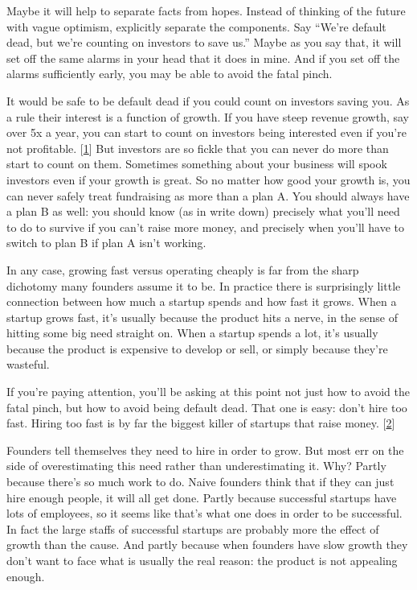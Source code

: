 Maybe it will help to separate facts from hopes. Instead of thinking of
the future with vague optimism, explicitly separate the components. Say
``We're default dead, but we're counting on investors to save us.''
Maybe as you say that, it will set off the same alarms in your head that
it does in mine. And if you set off the alarms sufficiently early, you
may be able to avoid the fatal pinch.

It would be safe to be default dead if you could count on investors
saving you. As a rule their interest is a function of growth. If you
have steep revenue growth, say over 5x a year, you can start to count on
investors being interested even if you're not profitable.
{[}\hyperref[f1n]{1}{]} But investors are so fickle that you can never
do more than start to count on them. Sometimes something about your
business will spook investors even if your growth is great. So no matter
how good your growth is, you can never safely treat fundraising as more
than a plan A. You should always have a plan B as well: you should know
(as in write down) precisely what you'll need to do to survive if you
can't raise more money, and precisely when you'll have to switch to plan
B if plan A isn't working.

In any case, growing fast versus operating cheaply is far from the sharp
dichotomy many founders assume it to be. In practice there is
surprisingly little connection between how much a startup spends and how
fast it grows. When a startup grows fast, it's usually because the
product hits a nerve, in the sense of hitting some big need straight on.
When a startup spends a lot, it's usually because the product is
expensive to develop or sell, or simply because they're wasteful.

If you're paying attention, you'll be asking at this point not just how
to avoid the fatal pinch, but how to avoid being default dead. That one
is easy: don't hire too fast. Hiring too fast is by far the biggest
killer of startups that raise money. {[}\hyperref[f2n]{2}{]}

Founders tell themselves they need to hire in order to grow. But most
err on the side of overestimating this need rather than underestimating
it. Why? Partly because there's so much work to do. Naive founders think
that if they can just hire enough people, it will all get done. Partly
because successful startups have lots of employees, so it seems like
that's what one does in order to be successful. In fact the large staffs
of successful startups are probably more the effect of growth than the
cause. And partly because when founders have slow growth they don't want
to face what is usually the real reason: the product is not appealing
enough.

